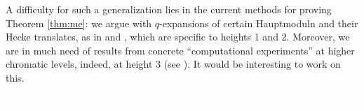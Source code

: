 \documentclass{rs}
\theoremstyle{definition}
\theoremstyle{remark}
\renewcommand{\=}{\approx}
\renewcommand{\-}{\sim}
\newcommand{\wt}[1]{\textcolor{white}{#1} \!~}
\numberwithin{equation}{section}
\begin{document}
A difficulty for such a generalization lies in the current methods for proving 
Theorem \ref{thm:me}: we argue with $q$-expansions of certain Hauptmoduln and 
their Hecke translates, as in \cite[Example 2.4]{Choi} and 
\cite[Section 1.11]{padicprop}, which are specific to heights 1 and 2.  
Moreover, we are in much need of results from concrete ``computational 
experiments'' at higher chromatic levels, indeed, at height 3 (see 
\cite{prime2, picsurf}).  It would be interesting to work on this.  



% 
% 

\vspace{.3in}
\renewcommand\refname{}
\newcommand{\AX}[1]{\href{http://arxiv.org/abs/#1}{arXiv:#1}}
\newcommand{\MRn}[2]{\href{http://www.ams.org/mathscinet-getitem?mr=#1}{MR#1#2}}
\wt{.}\vspace{-1.04in}
\end{document}
